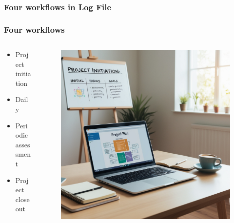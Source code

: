 \documentclass[aspectratio=169]{beamer}
\begin{document}
\subsubsection{Four workflows in Log File}
\begin{frame}
\frametitle{Four workflows}
    \begin{columns}
        \begin{column}{0.55\textwidth}
\Large{
\begin{itemize}[font=$\bullet$\scshape\bfseries]
    \item Project initiation 
    \item Daily 
    \item Periodic assessment
    \item Project closeout 
\end{itemize}
}
        \end{column}
        \begin{column}{0.45\textwidth}
            \begin{figure}
                \includegraphics[width=\textwidth]{Figures/ProjectInitiationOld.jpg}
            \end{figure}
        \end{column}
    \end{columns}
\end{frame}
\end{document}
